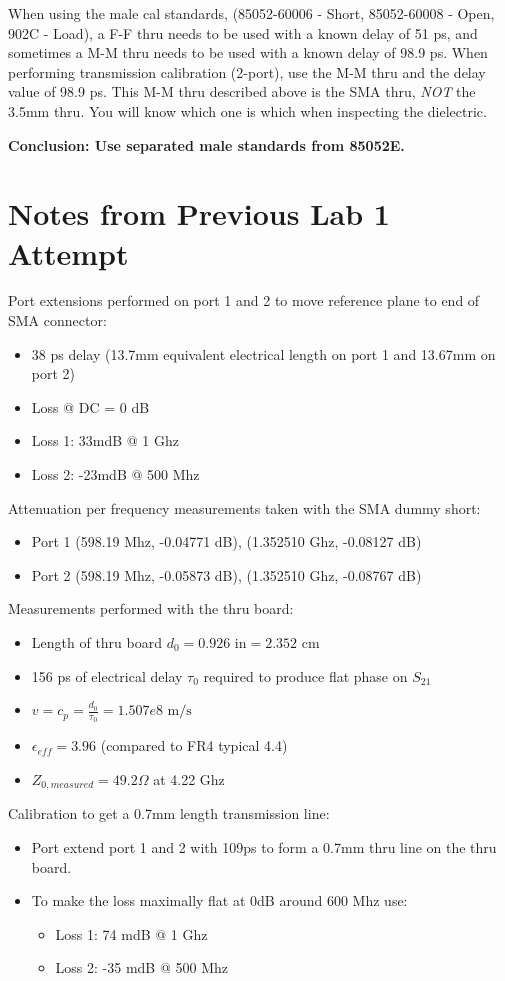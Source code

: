 When using the male cal standards, (85052-60006 - Short, 85052-60008 - Open, 902C - Load), a F-F thru needs to be used with a known delay of 51 ps, and sometimes a M-M thru needs to be used with a known delay of 98.9 ps.
When performing transmission calibration (2-port), use the M-M thru and the delay value of 98.9 ps.
This M-M thru described above is the SMA thru, \emph{NOT} the 3.5mm thru. You will know which one is which when inspecting the dielectric.

\textbf{Conclusion: Use separated male standards from 85052E.}
\section{Notes from Previous Lab 1 Attempt}

Port extensions performed on port 1 and 2 to move reference plane to end of SMA connector:
\begin{itemize}
    \item 38 ps delay (13.7mm equivalent electrical length on port 1 and 13.67mm on port 2)
    \item Loss @ DC = 0 dB
    \item Loss 1: 33mdB @ 1 Ghz
    \item Loss 2: -23mdB @ 500 Mhz
\end{itemize}

Attenuation per frequency measurements taken with the SMA dummy short:
\begin{itemize}
    \item Port 1 (598.19 Mhz, -0.04771 dB), (1.352510 Ghz, -0.08127 dB)
    \item Port 2 (598.19 Mhz, -0.05873 dB), (1.352510 Ghz, -0.08767 dB)
\end{itemize}

Measurements performed with the thru board:
\begin{itemize}
    \item Length of thru board $d_0 = 0.926 \text{ in} = 2.352 \text{ cm}$
    \item 156 ps of electrical delay $\tau_0$ required to produce flat phase on $S_{21}$
    \item $v = c_p = \frac{d_0}{\tau_0} = 1.507e8 \text{ m/s}$
    \item $\epsilon_{eff} = 3.96$ (compared to FR4 typical 4.4)
    \item $Z_{0,measured} = 49.2 \Omega$ at 4.22 Ghz
\end{itemize}

Calibration to get a 0.7mm length transmission line:
\begin{itemize}
    \item Port extend port 1 and 2 with 109ps to form a 0.7mm thru line on the thru board.
    \item To make the loss maximally flat at 0dB around 600 Mhz use:
    \begin{itemize}
        \item Loss 1: 74 mdB @ 1 Ghz
        \item Loss 2: -35 mdB @ 500 Mhz
    \end{itemize}
\end{itemize}

